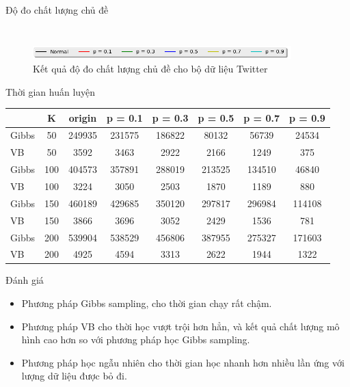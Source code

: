 \documentclass[pdf]{beamer}
\begin{document}
\begin{frame}{Độ đo chất lượng chủ đề }
\begin{columns}[T]
\begin{column}{.50\textwidth}
\begin{figure}
	\end{figure}				
\end{column} %
\end{columns}

\begin{figure}
	\begin{center}
		\captionsetup{justification=centering}
		\includegraphics[width=100mm]{menu.png}
		\caption{Kết quả độ đo chất lượng chủ đề cho bộ dữ liệu Twitter}
	\end{center}
\end{figure}
\end{frame}

\begin{frame}{Thời gian huấn luyện}
		\begin{tabular}{l|c |c | c | c | c | c | c }
		& K & origin & p = 0.1 & p = 0.3 & p = 0.5 & p = 0.7 & p = 0.9 \\
		\hline \hline
		Gibbs &50 & 249935& 231575 & 186822 & 80132 & 56739 & 24534 \\ 
		\hline
		VB &50 & 3592& 3463 & 2922 & 2166 &1249 & 375 \\
		\hline \hline
		Gibbs &100 &404573 & 357891 & 288019 & 213525 & 134510&  46840\\ 
		\hline
		VB &100 &3224 & 3050 & 2503 & 1870 &1189 &880\\
		\hline \hline
		Gibbs &150 &460189 & 429685 & 350120 & 297817 & 296984& 114108 \\ 
		\hline
		VB &150 &3866 & 3696 & 3052 & 2429 &1536 &781\\
		\hline \hline
		Gibbs &200 & 539904& 538529 & 456806 & 387955 & 275327 & 171603 \\ 
		\hline
		VB &200 &4925 & 4594 & 3313 & 2622 & 1944&1322\\
	\end{tabular}
\end{frame}

\begin{frame}{Đánh giá}
	\begin{itemize}
		\item Phương pháp Gibbs sampling, cho thời gian chạy rất chậm.
		\item Phương pháp VB cho thời học vượt trội hơn hẳn, và kết quả chất lượng mô hình cao hơn so với phương pháp học Gibbs sampling.
		\item Phương pháp học ngẫu nhiên cho thời gian học nhanh hơn nhiều lần ứng với lượng dữ liệu được bỏ đi.
	\end{itemize}
\end{frame}
\end{document}
